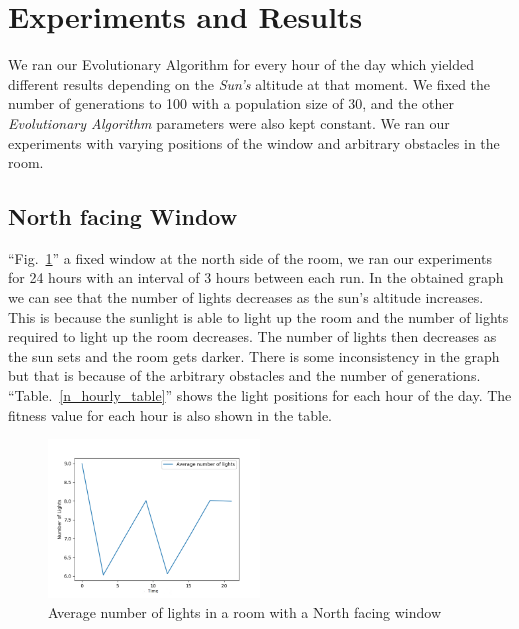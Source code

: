 \documentclass[conference]{IEEEtran}
\begin{document}
\section{Experiments and Results}
We ran our Evolutionary Algorithm for every hour of the day which yielded
different results depending on the \textit{Sun's} altitude at that moment. We
fixed the number of generations to 100 with a population size of 30, and the
other \textit{Evolutionary Algorithm} parameters were also kept constant. We
ran our experiments with varying positions of the window and arbitrary obstacles
in the room.

\subsection{North facing Window}
``Fig.~\ref{n_hourly}'' a fixed window at the north side of the room, we ran our experiments for
24 hours with an interval of 3 hours between each run. In the obtained graph we can see that the
number of lights decreases as the sun's altitude increases. This is because the sunlight is able to
light up the room and the number of lights required to light up the room decreases. The number of
lights then decreases as the sun sets and the room gets darker. There is some inconsistency in the
graph but that is because of the arbitrary obstacles and the number of generations. ``Table.~\ref{n_hourly_table}'' shows the light positions for each hour of the day. The fitness value for each hour is also shown in the table.

\begin{figure}[htbp]
    \centerline{\includegraphics[width=0.5\textwidth]{n_hourly.png}}
    \caption{Average number of lights in a room with a North facing window}
    \label{n_hourly}
\end{figure}
\end{document}
